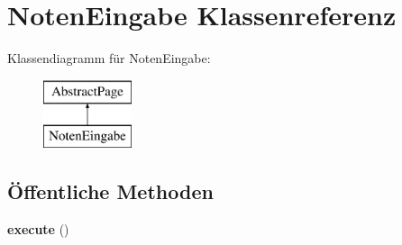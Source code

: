 \hypertarget{class_noten_eingabe}{}\section{Noten\+Eingabe Klassenreferenz}
\label{class_noten_eingabe}
Klassendiagramm für Noten\+Eingabe\+:\begin{figure}[H]
\begin{center}
\leavevmode
\includegraphics[height=2.000000cm]{class_noten_eingabe}
\end{center}
\end{figure}
\subsection*{Öffentliche Methoden}
\begin{DoxyCompactItemize}
\item 
\mbox{\label{class_noten_eingabe_aaa2d4417a9e95ca4aa1264a75d3b69b5}} 
{\bfseries execute} ()
\end{DoxyCompactItemize}
